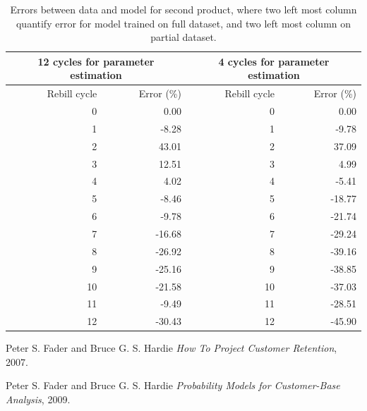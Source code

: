\documentclass[paper=a4, fontsize=11pt]{scrartcl} %
\numberwithin{equation}{section} %
\numberwithin{figure}{section} %
\numberwithin{table}{section} %
\begin{document}
\begin{table}[ht]
	\centering
	\begin{tabular}{rrrr}
		\hline
		\multicolumn{2}{c|}{12 cycles for parameter estimation} & \multicolumn{2}{c}{4 cycles for parameter estimation} \\
		\hline
		Rebill cycle & Error (\%) & Rebill cycle &  Error (\%) \\ 
		\hline
		0 & 0.00 & 0 & 0.00\\ 
		1 & -8.28 & 1 & -9.78\\ 
		2 & 43.01 & 2 & 37.09 \\ 
		3 & 12.51 & 3 & 4.99 \\ 
		4 & 4.02 & 4 & -5.41\\ 
		5 & -8.46 & 5 & -18.77 \\ 
		6 & -9.78 & 6 & -21.74 \\ 
		7 & -16.68 & 7 & -29.24  \\ 
		8 & -26.92 & 8 & -39.16 \\ 
		9 & -25.16 & 9 & -38.85 \\ 
		10 & -21.58 & 10 & -37.03 \\ 
		11 & -9.49 & 11 & -28.51 \\ 
		12 & -30.43 & 12 & -45.90 \\ 
		\hline
	\end{tabular}
	\caption{Errors between data and model for second product, where two left most column quantify error for model trained on full dataset, and two left most column on partial dataset.}
	\label{SV}
\end{table}



\begin{thebibliography}{9}
	
	Peter S. Fader and Bruce G. S. Hardie
	\textit{ How To Project Customer
		Retention},
	2007.
	
	Peter S. Fader and Bruce G. S. Hardie
	\textit{ Probability Models for Customer-Base Analysis},
	2009.
	
\end{thebibliography}
\end{document}
